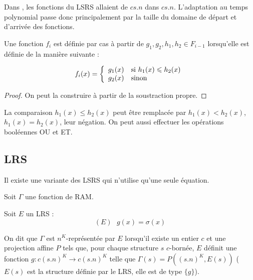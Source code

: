 			Dans \cite{GrandjeanSchwentick2002}, les fonctions du LSRS allaient de $c s.n$ dans $c s.n$. L'adaptation au temps polynomial passe donc principalement par la taille du domaine de départ et d'arrivée des fonctions.
			

			
			
			
			
			
			
			
			\begin{definition}
				Une fonction $f_i$ est définie par cas à partir de $g_1, g_2, h_1, h_2 \in F_{i-1}$ lorsqu'elle est définie de la manière suivante :
				
				\[
				f_i(x) = \left\lbrace \begin{array}{ll} 
				g_1(x) & \text{si $h_1(x) \leqslant h_2(x)$} \\
				g_2(x) & \text{sinon}
				 \end{array} \right.
				\]
			\end{definition}
			
			
			\begin{proof}
				On peut la construire à partir de la soustraction propre.
			\end{proof}
			
			\begin{remark}
				La comparaison $h_1(x) \leqslant h_2(x)$ peut être remplacée par $h_1(x) < h_2(x)$, $h_1(x) = h_2(x)$, leur négation. On peut aussi effectuer les opérations booléennes OU et ET.
			\end{remark}
			
		
		
		\subsection{LRS} %
		\label{subsec:LRS}
		
		Il existe une variante des LSRS qui n'utilise qu'une seule équation.
		
		
		\begin{definition}
			\label{def:representee_par_LRS}
			Soit $\Gamma$ une fonction de RAM. 
			
			Soit $E$ un LRS :
			\[
			(E) \ \ \ g(x) = \sigma(x)
			\]
			
			On dit que $\Gamma$ est $n^K$-représentée par $E$ lorsqu'il existe un entier $c$ et une projection affine $P$ tels que, pour chaque structure $s$ $c$-bornée, $E$ définit une fonction $g : c (s.n)^K \to c (s.n)^K$ telle que $\Gamma(s) = P\left((s.n)^K, E(s)\right)$ ($E(s)$ est la structure définie par le LRS, elle est de type $\{g\}$).
		\end{definition}
		

